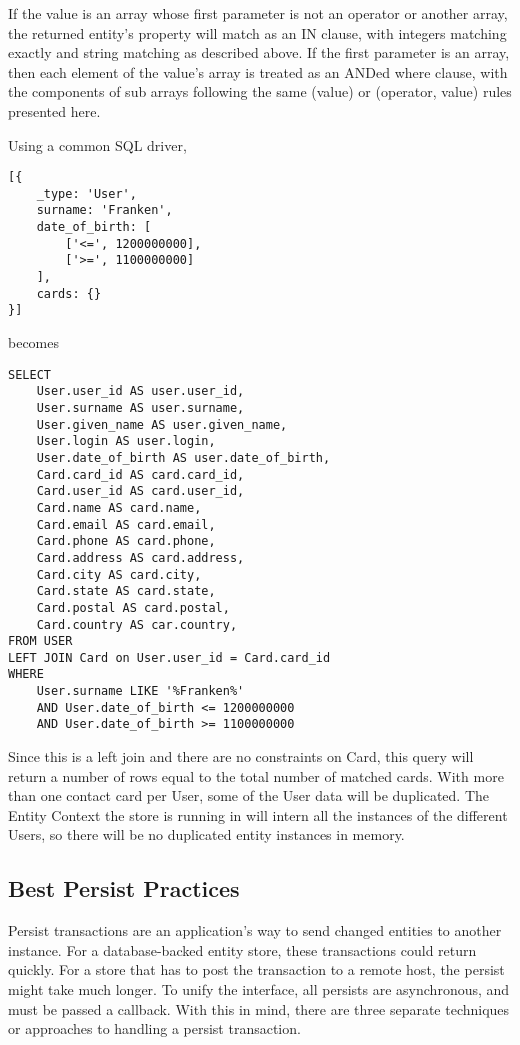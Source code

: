\documentclass{article}
\begin{document}


If the value is an array whose first parameter is not an operator or another
array, the returned entity's property will match as an IN clause, with integers
matching exactly and string matching as described above. If the first parameter
is an array, then each element of the value's array is treated as an ANDed where
clause, with the components of sub arrays following the same (value) or
(operator, value) rules presented here.

Using a common SQL driver,
\linespread{1}
\begin{lstlisting}
[{
	_type: 'User',
	surname: 'Franken',
	date_of_birth: [
		['<=', 1200000000],
		['>=', 1100000000]
	],
	cards: {}
}]
\end{lstlisting}
\linespread{1.6}

becomes

\linespread{1}
\begin{lstlisting}
SELECT
	User.user_id AS user.user_id,
	User.surname AS user.surname,
	User.given_name AS user.given_name,
	User.login AS user.login,
	User.date_of_birth AS user.date_of_birth,
	Card.card_id AS card.card_id,
	Card.user_id AS card.user_id,
	Card.name AS card.name,
	Card.email AS card.email,
	Card.phone AS card.phone,
	Card.address AS card.address,
	Card.city AS card.city,
	Card.state AS card.state,
	Card.postal AS card.postal,
	Card.country AS car.country,
FROM USER
LEFT JOIN Card on User.user_id = Card.card_id
WHERE
	User.surname LIKE '%Franken%'
	AND User.date_of_birth <= 1200000000
	AND User.date_of_birth >= 1100000000
\end{lstlisting}
\linespread{1.6}

Since this is a left join and there are no constraints on Card, this query will
return a number of rows equal to the total number of matched cards. With more
than one contact card per User, some of the User data will be duplicated. The
Entity Context the store is running in will intern all the instances of the
different Users, so there will be no duplicated entity instances in memory.

\subsection{Best Persist Practices}
Persist transactions are an application's way to send changed entities to
another instance. For a database-backed entity store, these transactions could
return quickly. For a store that has to post the transaction to a remote host,
the persist might take much longer. To unify the interface, all persists are
asynchronous, and must be passed a callback. With this in mind, there are three
separate techniques or approaches to handling a persist transaction.
\end{document}
